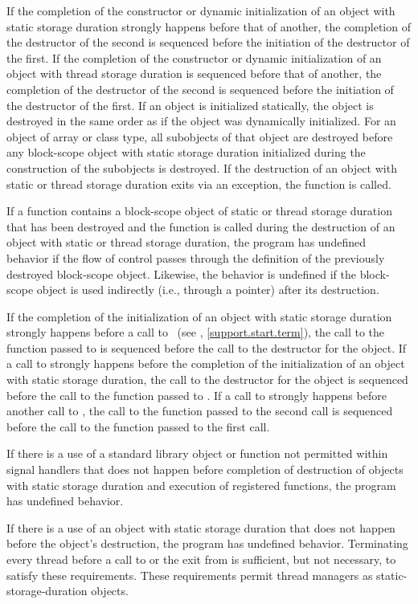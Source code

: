 \pnum
If the completion of the constructor or dynamic initialization of an object with static
storage duration strongly happens before that of another, the completion of the destructor
of the second is sequenced before the initiation of the destructor of the first.
If the completion of the constructor or dynamic initialization of an object with thread
storage duration is sequenced before that of another, the completion of the destructor
of the second is sequenced before the initiation of the destructor of the first.
If an object is
initialized statically, the object is destroyed in the same order as if
the object was dynamically initialized. For an object of array or class
type, all subobjects of that object are destroyed before any block-scope
object with static storage duration initialized during the construction
of the subobjects is destroyed.
If the destruction of an object with static or thread storage duration
exits via an exception,
the function  is called.

\pnum
If a function contains a block-scope object of static or thread storage duration that has been
destroyed and the function is called during the destruction of an object with static or
thread storage duration, the program has undefined behavior if the flow of control
passes through the definition of the previously destroyed block-scope object. Likewise, the
behavior is undefined if the block-scope object is used indirectly (i.e., through a
pointer) after its destruction.

\pnum
{}%
%
If the completion of the initialization of an object with static storage
duration strongly happens before a call to ~(see
, \ref{support.start.term}), the call to the function passed to
 is sequenced before the call to the destructor for the object. If a
call to  strongly happens before the completion of the initialization of
an object with static storage duration, the call to the destructor for the
object is sequenced before the call to the function passed to . If a
call to  strongly happens before another call to , the
call to the function passed to the second  call is sequenced before
the call to the function passed to the first  call.

\pnum
If there is a use of a standard library object or function not permitted within signal
handlers that does not happen before
completion of destruction of objects with static storage duration and execution of
 registered functions, the program has
undefined behavior.
\begin{note}
If there is a use of an object with static storage
duration that does not happen before the object's destruction, the program has undefined
behavior. Terminating every thread before a call to  or the exit from
 is sufficient, but not necessary, to satisfy these requirements. These
requirements permit thread managers as static-storage-duration objects.
\end{note}

